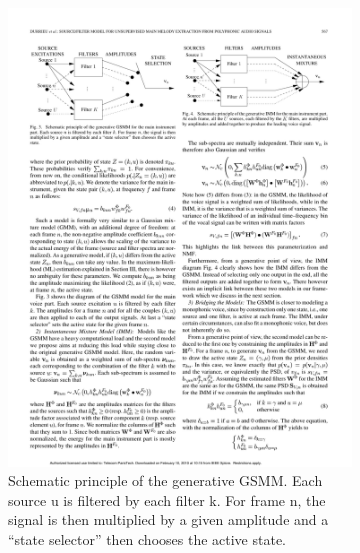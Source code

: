 \begin{figure}
        \centering
        \begin{subfigure}[b]{0.47\textwidth}
                \includegraphics[width=\textwidth]{Figures/gsmm}
                \caption{Schematic principle of the generative GSMM. Each source u is filtered by each filter k. For frame n, the signal is then multiplied by a  given amplitude and a ``state selector'' then chooses the active state.}
                \label{fig:gsmm}
        \end{subfigure}%
        ~ %
        \begin{subfigure}[b]{0.47\textwidth}

\end{subfigure}
\end{figure}
